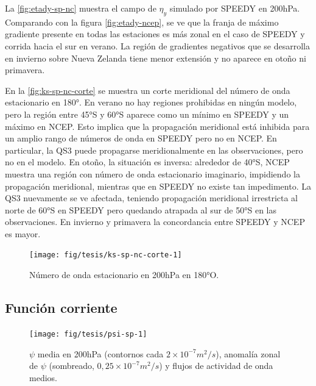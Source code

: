 \documentclass[spanish,a4paper,12pt,oneside]{book}
\begin{document}
La \autoref{fig:etady-sp-nc} muestra el campo de \(\eta_{y}\) simulado
por SPEEDY en 200hPa. Comparando con la figura \autoref{fig:etady-ncep},
se ve que la franja de máximo gradiente presente en todas las estaciones
es más zonal en el caso de SPEEDY y corrida hacia el sur en verano. La
región de gradientes negativos que se desarrolla en invierno sobre Nueva
Zelanda tiene menor extensión y no aparece en otoño ni primavera.

En la \autoref{fig:ks-sp-nc-corte} se muestra un corte meridional del
número de onda estacionario en 180°. En verano no hay regiones
prohibidas en ningún modelo, pero la región entre 45°S y 60°S aparece
como un mínimo en SPEEDY y un máximo en NCEP. Esto implica que la
propagación meridional está inhibida para un amplio rango de números de
onda en SPEEDY pero no en NCEP. En particular, la QS3 puede propagarse
meridionalmente en las observaciones, pero no en el modelo. En otoño, la
situación es inversa: alrededor de 40°S, NCEP muestra una región con
número de onda estacionario imaginario, impidiendo la propagación
meridional, mientras que en SPEEDY no existe tan impedimento. La QS3
nuevamente se ve afectada, teniendo propagación meridional irrestricta
al norte de 60°S en SPEEDY pero quedando atrapada al sur de 50°S en las
observaciones. En invierno y primavera la concordancia entre SPEEDY y
NCEP es mayor.

\begin{figure}
\texttt{[image: fig/tesis/ks-sp-nc-corte-1]} \caption{Número de onda estacionario en 200hPa en 180°O.}\label{fig:ks-sp-nc-corte}
\end{figure}

\subsection{Función corriente}\label{funcion-corriente-2}

\begin{landscape}\begin{figure}

{\centering \texttt{[image: fig/tesis/psi-sp-1]} 

}

\caption{$\psi$ media en 200hPa (contornos cada $2\times10^{-7}m^2/s$), anomalía zonal de $\psi$ (sombreado,  $0,25\times10^{-7}m^2/s$) y flujos de actividad de onda medios.}\label{fig:psi-sp}
\end{figure}
\end{landscape}
\end{document}
